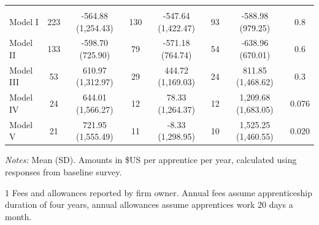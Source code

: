 \documentclass[
  a4paper, twoside, 12pt]{book}
\begin{document}
\begin{table}[H]
{\begin{threeparttable}
\begin{tabular}[t]{lccccccc}
\addlinespace[0.3em]
\multicolumn{8}{l}{\textbf{Net Benefits}}\\
\hspace{1em}Model I & 223 & -564.88 (1,254.43) & 130 & -547.64 (1,422.47) & 93 & -588.98 (979.25) & 0.8\\
\hspace{1em}Model II & 133 & -598.70 (725.90) & 79 & -571.18 (764.74) & 54 & -638.96 (670.01) & 0.6\\
\hspace{1em}Model III & 53 & 610.97 (1,312.97) & 29 & 444.72 (1,169.03) & 24 & 811.85 (1,468.62) & 0.3\\
\hspace{1em}Model IV & 24 & 644.01 (1,566.27) & 12 & 78.33 (1,264.37) & 12 & 1,209.68 (1,683.05) & 0.076\\
\hspace{1em}Model V & 21 & 721.95 (1,555.49) & 11 & -8.33 (1,298.95) & 10 & 1,525.25 (1,460.55) & 0.020\\
\bottomrule
\end{tabular}
\begin{tablenotes}
\small
\item \textit{Notes:} Mean (SD). Amounts in \$US per apprentice per year, calculated using responses from baseline survey.
\item[1] Fees and allowances reported by firm owner. Annual fees assume apprenticeship duration of four years, annual allowances assume apprentices work 20 days a month.
\end{tablenotes}
\end{threeparttable}}
\end{table}
\end{document}
